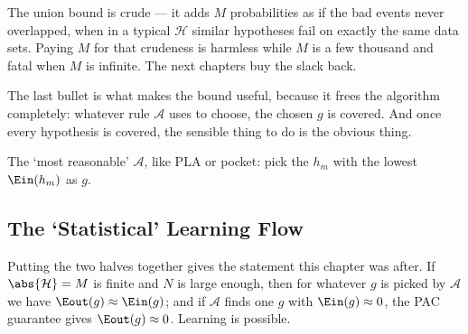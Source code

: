 \begin{remark}
    The union bound is crude --- it adds \(M\) probabilities as if the bad
    events never overlapped, when in a typical \(\mathcal{H}\) similar
    hypotheses fail on exactly the same data sets. Paying \(M\) for that
    crudeness is harmless while \(M\) is a few thousand and fatal when \(M\) is
    infinite. The next chapters buy the slack back.
\end{remark}

The last bullet is what makes the bound useful, because it frees the algorithm
completely: whatever rule \(\mathcal{A}\) uses to choose, the chosen \(g\) is
covered. And once every hypothesis is covered, the sensible thing to do is the
obvious thing.

\begin{moral}
    The `most reasonable' \(\mathcal{A}\), like PLA or pocket: pick the \(h_m\)
    with the lowest \(\Ein(h_m)\) as \(g\).
\end{moral}

\subsection{The `Statistical' Learning Flow}

Putting the two halves together gives the statement this chapter was after. If
\(\abs{\mathcal{H}} = M\) is finite and \(N\) is large enough, then for whatever
\(g\) is picked by \(\mathcal{A}\) we have \(\Eout(g) \approx \Ein(g)\); and if
\(\mathcal{A}\) finds one \(g\) with \(\Ein(g) \approx 0\), the PAC guarantee
gives \(\Eout(g) \approx 0\). Learning is possible.

